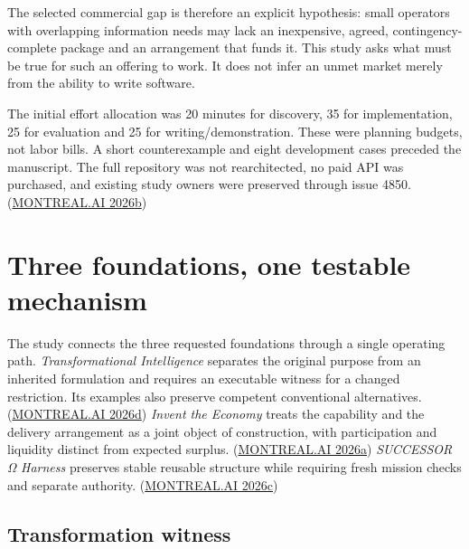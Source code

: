 \documentclass[11pt,letterpaper]{article}
\begin{document}
The selected commercial gap is therefore an explicit hypothesis: small
operators with overlapping information needs may lack an inexpensive,
agreed, contingency-complete package and an arrangement that funds it.
This study asks what must be true for such an offering to work. It does
not infer an unmet market merely from the ability to write software.

The initial effort allocation was 20 minutes for discovery, 35 for
implementation, 25 for evaluation and 25 for writing/demonstration.
These were planning budgets, not labor bills. A short counterexample and
eight development cases preceded the manuscript. The full repository was
not rearchitected, no paid API was purchased, and existing study owners
were preserved through issue 4850.
(\protect\hyperlink{ref-coordination}{MONTREAL.AI 2026b})

\hypertarget{three-foundations-one-testable-mechanism}{%
\section{Three foundations, one testable
mechanism}\label{three-foundations-one-testable-mechanism}}

The study connects the three requested foundations through a single
operating path. \emph{Transformational Intelligence} separates the
original purpose from an inherited formulation and requires an
executable witness for a changed restriction. Its examples also preserve
competent conventional alternatives.
(\protect\hyperlink{ref-ti}{MONTREAL.AI 2026d}) \emph{Invent the
Economy} treats the capability and the delivery arrangement as a joint
object of construction, with participation and liquidity distinct from
expected surplus. (\protect\hyperlink{ref-economy}{MONTREAL.AI 2026a})
\emph{SUCCESSOR Ω Harness} preserves stable reusable structure while
requiring fresh mission checks and separate authority.
(\protect\hyperlink{ref-harness}{MONTREAL.AI 2026c})

\hypertarget{transformation-witness}{%
\subsection{Transformation witness}\label{transformation-witness}}
\end{document}

